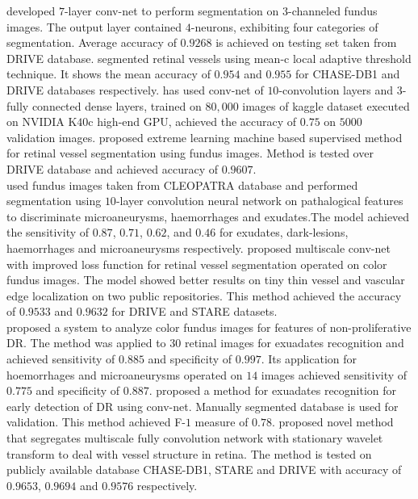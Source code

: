 \documentclass[12pt,a4paper,titlepage]{report}
\begin{document}
\noindent \cite{tan2017segmentation} developed $7$-layer conv-net to perform segmentation on $3$-channeled fundus images. The output layer contained $4$-neurons, exhibiting four categories of segmentation. Average accuracy of $0.9268$ is achieved on testing set taken from DRIVE database. \cite{dash2017thresholding} segmented retinal vessels using mean-c local adaptive threshold technique. It shows the mean accuracy of $0.954$ and $0.955$ for CHASE-DB1 and DRIVE databases respectively.
\cite{pratt2016convolutional} has used conv-net of $10$-convolution layers and $3$-fully connected dense layers, trained on $80,000$ images of kaggle dataset executed on NVIDIA K$40$c high-end GPU, achieved the accuracy of $0.75$ on $5000$ validation images.
\cite{zhu2017retinal} proposed extreme learning machine based supervised method for retinal vessel segmentation using fundus images. Method is tested over DRIVE database and achieved accuracy of $0.9607$.\\

\noindent \cite{tan2017automated} used fundus images taken from CLEOPATRA database and performed segmentation using $10$-layer convolution neural network on pathalogical features to discriminate microaneurysms, haemorrhages and exudates.The model achieved the sensitivity of $0.87$, $0.71$, $0.62$, and $0.46$ for exudates, dark-lesions, haemorrhages and microaneurysms respectively.
\cite{hu2018retinal} proposed multiscale conv-net with improved loss function for retinal vessel segmentation operated on color fundus images. The model showed better results on tiny thin vessel and vascular edge localization on two public repositories. This method achieved the accuracy of $0.9533$ and $0.9632$ for DRIVE and STARE datasets.\\

\noindent \cite{sinthanayothin2002automated} proposed a system to analyze color fundus images for features of non-proliferative DR. The method was applied to $30$ retinal images for exuadates recognition and achieved sensitivity of $0.885$ and specificity of $0.997$. Its application for hoemorrhages and microaneurysms operated on $14$ images achieved sensitivity of $0.775$ and specificity of $0.887$.
\cite{prentavsic2016detection} proposed a method for exuadates recognition for early detection of DR using conv-net. Manually segmented database is used for validation. This method achieved F-$1$ measure of $0.78$.
\cite{oliveira2018retinal} proposed novel method that segregates multiscale fully convolution network with stationary wavelet transform to deal with vessel structure in retina. The method is tested on publicly available database CHASE-DB1, STARE and DRIVE with accuracy of $0.9653$, $0.9694$ and $0.9576$ respectively.\\
\end{document}
